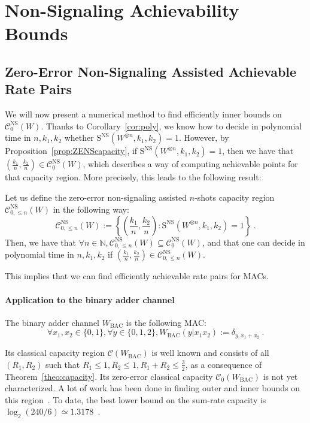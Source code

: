 \section{Non-Signaling Achievability Bounds}
\label{section:IB}
\subsection{Zero-Error Non-Signaling Assisted Achievable Rate Pairs}
We will now present a numerical method to find efficiently inner bounds on $\mathcal{C}_0^{\mathrm{NS}}(W)$. Thanks to Corollary~\ref{cor:poly}, we know how to decide in polynomial time in $n,k_1,k_2$ whether $\mathrm{S}^{\mathrm{NS}}(W^{\otimes n},k_1,k_2)=1$. However, by Proposition~\ref{prop:ZENScapacity}, if $\mathrm{S}^{\mathrm{NS}}(W^{\otimes n},k_1,k_2)=1$, then we have that $\left(\frac{k_1}{n},\frac{k_2}{n}\right) \in \mathcal{C}_0^{\mathrm{NS}}(W)$, which describes a way of computing achievable points for that capacity region. More precisely, this leads to the following result:

\begin{proposition}
  \label{prop:IB}
  Let us define the zero-error non-signaling assisted $n$-shots capacity region $\mathcal{C}_{0,\leq n}^{\mathrm{NS}}(W)$ in the following way:
  \[ \mathcal{C}_{0,\leq n}^{\mathrm{NS}}(W)  := \left\{ \left(\frac{k_1}{n},\frac{k_2}{n}\right) : \mathrm{S}^{\mathrm{NS}}(W^{\otimes n},k_1,k_2)=1 \right\}\ . \]
  Then, we have that $\forall n \in \mathbb{N}, \mathcal{C}_{0,\leq n}^{\mathrm{NS}}(W) \subseteq \mathcal{C}_0^{\mathrm{NS}}(W)$, and that one can decide in polynomial time in $n,k_1,k_2$ if $\left(\frac{k_1}{n},\frac{k_2}{n}\right) \in \mathcal{C}_{0,\leq n}^{\mathrm{NS}}(W)$.
\end{proposition}

This implies that we can find efficiently achievable rate pairs for MACs.

\paragraph{Application to the binary adder channel}
The binary adder channel $W_{\text{BAC}}$ is the following MAC:
\[ \forall x_1,x_2 \in \{0,1\}, \forall y \in \{0,1,2\}, W_{\text{BAC}}(y|x_1x_2) := \delta_{y,x_1+x_2} \ .\]

Its classical capacity region $\mathcal{C}(W_{\text{BAC}})$ is well known and consists of all $(R_1,R_2)$ such that $R_1 \leq 1,R_2 \leq 1, R_1+R_2 \leq \frac{3}{2}$, as a consequence of Theorem~\ref{theo:capacity}. Its zero-error classical capacity $\mathcal{C}_0(W_{\text{BAC}})$ is not yet characterized. A lot of work has been done in finding outer and inner bounds on this region~\cite{Lindstrom69,Tilborg78,KL78,Weldon78,KLWY83,BT85,BB98,UL98,AB99,MO05,OS15}. To date, the best lower bound on the sum-rate capacity is $\log_2(240/6) \simeq 1.3178$~\cite{MO05}.

